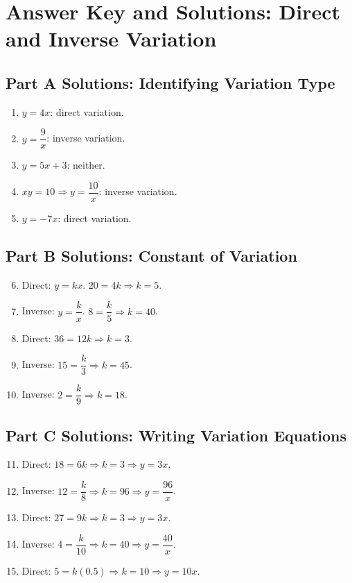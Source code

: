 \documentclass[12pt]{article}
\begin{document}
\newpage


\section*{Answer Key and Solutions: Direct and Inverse Variation}

\subsection*{Part A Solutions: Identifying Variation Type}
\begin{enumerate}
  \item \(y=4x\): direct variation.
  \item \(y=\dfrac{9}{x}\): inverse variation.
  \item \(y=5x+3\): neither.
  \item \(xy=10 \Rightarrow y=\dfrac{10}{x}\): inverse variation.
  \item \(y=-7x\): direct variation.
\end{enumerate}

\subsection*{Part B Solutions: Constant of Variation}
\begin{enumerate}
  \setcounter{enumi}{5}
  \item Direct: \(y=kx\). \(20=4k \Rightarrow \boxed{k=5}\).
  \item Inverse: \(y=\dfrac{k}{x}\). \(8=\dfrac{k}{5} \Rightarrow \boxed{k=40}\).
  \item Direct: \(36=12k \Rightarrow \boxed{k=3}\).
  \item Inverse: \(15=\dfrac{k}{3} \Rightarrow \boxed{k=45}\).
  \item Inverse: \(2=\dfrac{k}{9} \Rightarrow \boxed{k=18}\).
\end{enumerate}

\subsection*{Part C Solutions: Writing Variation Equations}
\begin{enumerate}
  \setcounter{enumi}{10}
  \item Direct: \(18=6k \Rightarrow k=3 \Rightarrow \boxed{y=3x}\).
  \item Inverse: \(12=\dfrac{k}{8} \Rightarrow k=96 \Rightarrow \boxed{y=\dfrac{96}{x}}\).
  \item Direct: \(27=9k \Rightarrow k=3 \Rightarrow \boxed{y=3x}\).
  \item Inverse: \(4=\dfrac{k}{10} \Rightarrow k=40 \Rightarrow \boxed{y=\dfrac{40}{x}}\).
  \item Direct: \(5=k(0.5) \Rightarrow k=10 \Rightarrow \boxed{y=10x}\).
\end{enumerate}
\end{document}
